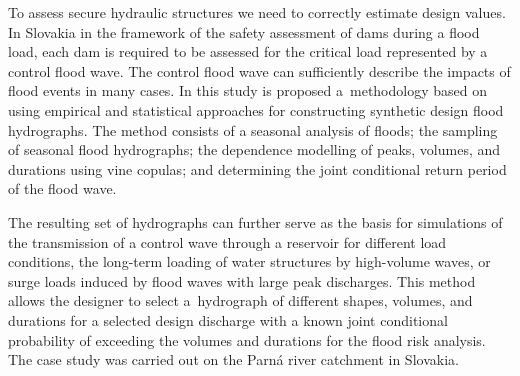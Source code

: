 \noindent

To assess secure hydraulic structures we need to correctly estimate design values. In Slovakia in the framework of the safety assessment of dams during a flood load, each dam is required to be assessed for the critical load represented by a control flood wave. The control flood wave can sufficiently describe the impacts of flood events in many cases. In this study is proposed a methodology based on using empirical and statistical approaches for constructing synthetic design flood hydrographs. The method consists of a seasonal analysis of floods; the sampling of seasonal flood hydrographs; the dependence modelling of peaks, volumes, and durations using vine copulas; and determining the joint conditional return period of the flood wave.

The resulting set of hydrographs can further serve as the basis for simulations of the transmission of a control wave through a reservoir for different load conditions, the long-term loading of water structures by high-volume waves, or surge loads induced by flood waves with large peak discharges. This method allows the designer to select a hydrograph of different shapes, volumes, and durations for a selected design discharge with a known joint conditional probability of exceeding the volumes and durations for the flood risk analysis. The case study was carried out on the Parná river catchment in Slovakia.
\newpage{}
{}
\begin{flushleft}






\end{flushleft}

\noindent

